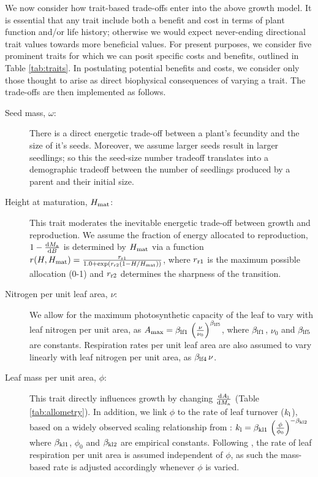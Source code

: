 \documentclass[a4paper,11pt]{article}
\begin{document}
We now consider how trait-based trade-offs enter into the above growth model. It is essential that any trait include both a benefit and cost in terms of plant function and/or life history; otherwise we would expect never-ending directional trait values towards more beneficial values. For present purposes, we consider five prominent traits for which we can posit specific costs and benefits, outlined in Table \ref{tab:traits}. In postulating potential benefits and costs, we consider only those thought to arise as direct biophysical consequences of varying a trait. The trade-offs are then implemented as follows.
\begin{description}
\item[Seed mass, $\omega$:] There is a direct energetic trade-off between a plant's fecundity and the size of it's seeds. Moreover, we assume larger seeds result in larger seedlings; so this the seed-size number tradeoff translates into a demographic tradeoff between the number of seedlings produced by a parent and their initial size.
\item[Height at maturation, $H_{{\rm mat}}$:] This trait moderates the inevitable energetic trade-off between growth and reproduction. We assume the fraction of energy allocated to reproduction, $1- \frac{{\rm d}M_{{\rm a}}}{{\rm d}B}$ is determined by $H_{{\rm mat}}$ via a function $r(H, H_{{\rm mat}}) = \frac{r_{\rm r1}} {1.0 + \exp\left(r_{\rm r2} \left(1 - H / H_{{\rm mat}}\right)\right)}$, where $r_{\rm r1}$ is the maximum possible allocation (0-1) and $r_{\rm r2}$ determines the sharpness of the transition.
\item[Nitrogen per unit leaf area,  $\nu$:] We allow for the maximum photosynthetic capacity of the leaf to vary with leaf nitrogen per unit area, as $A_{\rm max} = \beta_{{\rm lf1}} \, \left(\frac{\nu}{\nu_0}\right)^{\beta_{{\rm lf5}}}$, where $\beta_{{\rm lf1}}$, $\nu_0$ and $\beta_{{\rm lf5}}$ are constants. Respiration rates per unit leaf area are also assumed to vary linearly with leaf nitrogen per unit area, as $\beta_{{\rm lf4}}\, \nu$.
\item[Leaf mass per unit area, $\phi$:] This trait directly influences growth by changing $\frac{{\rm d}A_{\rm l}}{{\rm d}M_{\rm a}}$ (Table \ref{tab:allometry}). In addition, we link $\phi$ to the rate of leaf turnover ($k_{\rm l}$), based on a widely observed scaling relationship from \citet{Wright-2004}: $k_{\rm l} = \beta_{{\rm kl1}} \, \left(\frac{\phi}{\phi_0}\right)^{-\beta_{{\rm kl2}}}$ where $\beta_{{\rm kl1}}$, $\phi_0$ and $\beta_{{\rm kl2}}$ are empirical constants. Following \citet{Wright-2004}, the rate of leaf respiration per unit area is assumed independent of $\phi$, as such the mass-based rate is adjusted accordingly whenever $\phi$ is varied.

\end{description}
\end{document}
